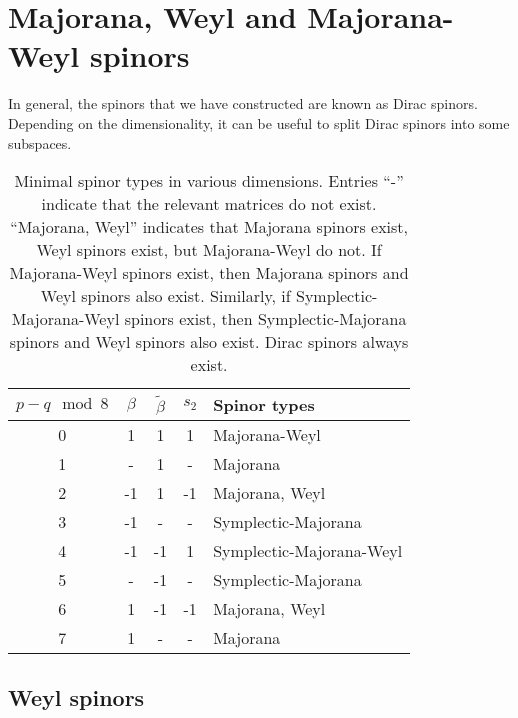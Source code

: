 \documentclass[11pt]{article}
\newcommand{\betat}{\tilde{\beta}}
\begin{document}
\section{Majorana, Weyl and Majorana-Weyl spinors}\label{sec:subtypes}

In general, the spinors that we have constructed are known as Dirac spinors.
Depending on the dimensionality, it can be useful to split Dirac spinors into some subspaces.


\begin{table}
  \centering
  \begin{tabular}{ccccl}
  \toprule
    $p-q \mod 8$ & $\beta$ & $\betat$ & $s_2$ & Spinor types  \\
  \midrule
    0 & 1  & 1  & 1  & Majorana-Weyl            \\
    1 & -  & 1  & -  & Majorana                 \\
    2 & -1 & 1  & -1 & Majorana, Weyl           \\
    3 & -1 & -  & -  & Symplectic-Majorana      \\
    4 & -1 & -1 & 1  & Symplectic-Majorana-Weyl \\
    5 & -  & -1 & -  & Symplectic-Majorana      \\
    6 & 1  & -1 & -1 & Majorana, Weyl           \\
    7 & 1  & -  & -  & Majorana                 \\
  \bottomrule
  \end{tabular}
  \caption{Minimal spinor types in various dimensions.
  Entries ``-'' indicate that the relevant matrices do not exist.
  ``Majorana, Weyl'' indicates that Majorana spinors exist, Weyl spinors exist, but Majorana-Weyl do not.
  If Majorana-Weyl spinors exist, then Majorana spinors and Weyl spinors also exist.
  Similarly, if Symplectic-Majorana-Weyl spinors exist, then Symplectic-Majorana spinors and Weyl spinors also exist.
  Dirac spinors always exist.
  }\label{tab:types}
\end{table}



\subsection{Weyl spinors}\label{sec:weyl}
\end{document}
